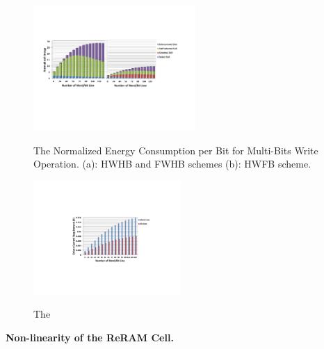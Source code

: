 \begin{figure}%
\centering
  \includegraphics[width=0.55\textwidth]{./figures/multi_energy.pdf}\\
  \caption{The Normalized Energy Consumption per Bit for Multi-Bits Write Operation. (a): HWHB and  FWHB schemes (b): HWFB scheme. }\label{fig:multi_energy}
\end{figure}


\begin{figure}%
\centering
  \includegraphics[width=0.5\textwidth]{./figures/multi_I.pdf}\\
  \caption{The }\label{fig:multi_I}
\end{figure}

\vspace{10pt} \textbf{Non-linearity of the ReRAM Cell.} \vspace{8pt}

